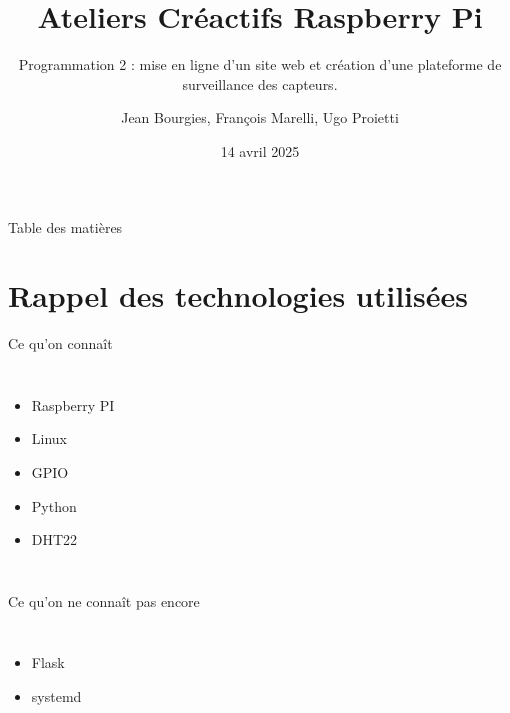 \documentclass[aspectratio=169,xcolor=dvipsnames]{beamer}
\title{Ateliers Créactifs Raspberry Pi}
\subtitle{Programmation 2 : mise en ligne d'un site web et création d'une plateforme de surveillance des capteurs.}
\author{Jean Bourgies, François Marelli, Ugo Proietti}
\date{14 avril 2025}
\begin{document}
\begin{frame}
    \titlepage
\end{frame}

\begin{frame}{Table des matières}
    \tableofcontents
\end{frame}

\section{Rappel des technologies utilisées}

\begin{frame}{Ce qu'on connaît}
    \begin{columns}[c] %

        \begin{itemize}
            \item Raspberry PI
            \item Linux
            \item GPIO
            \item Python
            \item DHT22
        \end{itemize}

    \end{columns}
\end{frame}

\begin{frame}{Ce qu'on ne connaît pas encore}
    \begin{columns}[c] %

        \begin{itemize}
            \item Flask
            \item systemd
        \end{itemize}

    \end{columns}
\end{frame}
\end{document}
